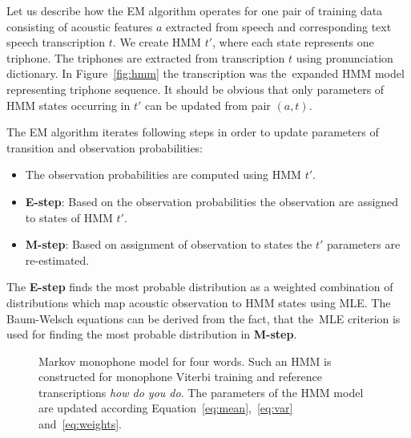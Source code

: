 {
Let us describe how the \ac{EM} algorithm operates for one pair
of training data consisting of acoustic features $a$ extracted from speech
and corresponding text speech transcription $t$.
We create \ac{HMM} $t'$, where each state represents one triphone. 
The triphones are extracted from transcription $t$ using pronunciation dictionary.
In Figure~\ref{fig:hmm} the transcription  
was the~expanded \ac{HMM} model representing triphone sequence.
It should be obvious that only parameters of HMM states 
occurring in $t'$ can be updated from pair $(a, t)$.

The \ac{EM} algorithm iterates following steps in order 
to update parameters of transition and observation probabilities:
\begin{itemize}
    \item The observation probabilities are computed using \ac{HMM} $t'$. 
    \item {\bf E-step}: Based on the observation probabilities the observation are assigned to states of \ac{HMM} $t'$. 
    \item {\bf M-step}: Based on assignment of observation to states the $t'$ parameters are re-estimated. 
\end{itemize}

The {\bf E-step} finds the most probable distribution as a weighted combination of distributions which map acoustic observation to \ac{HMM} states using \ac{MLE}\cite{gopinath1998maximum}.
The Baum-Welsch equations can be derived from the fact, that the~\ac{MLE} criterion is used for finding the most probable distribution in {\bf M-step}.\cite{huang2001spoken}

\begin{figure}[!htp]
    \begin{center}
    
    \caption{Markov monophone model for four words. Such an \ac{HMM} is constructed for monophone Viterbi training and reference transcriptions \textit{how do you do}. The parameters of the \ac{HMM} model are updated according Equation~\ref{eq:mean},~\ref{eq:var} and~\ref{eq:weights}.}
    \label{fig:hmm_words} 
    \end{center}
\end{figure}

}

